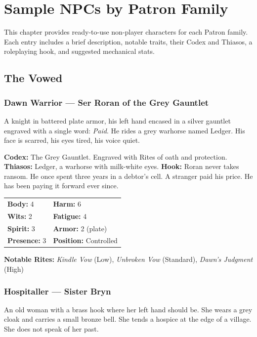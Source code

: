 \section{Sample NPCs by Patron Family}

This chapter provides ready-to-use non-player characters for each Patron family. Each entry includes a brief description, notable traits, their Codex and Thiasos, a roleplaying hook, and suggested mechanical stats.

\subsection{The Vowed}

\subsubsection{Dawn Warrior — Ser Roran of the Grey Gauntlet}

A knight in battered plate armor, his left hand encased in a silver gauntlet engraved with a single word: \textit{Paid}. He rides a grey warhorse named Ledger. His face is scarred, his eyes tired, his voice quiet.

\textbf{Codex:} The Grey Gauntlet. Engraved with Rites of oath and protection.
\textbf{Thiasos:} Ledger, a warhorse with milk-white eyes.
\textbf{Hook:} Roran never takes ransom. He once spent three years in a debtor's cell. A stranger paid his price. He has been paying it forward ever since.

\begin{tabular}{ll}
\textbf{Body:} 4 & \textbf{Harm:} 6 \\
\textbf{Wits:} 2 & \textbf{Fatigue:} 4 \\
\textbf{Spirit:} 3 & \textbf{Armor:} 2 (plate) \\
\textbf{Presence:} 3 & \textbf{Position:} Controlled \\
\end{tabular}

\textbf{Notable Rites:} \textit{Kindle Vow} (Low), \textit{Unbroken Vow} (Standard), \textit{Dawn's Judgment} (High)

\subsubsection{Hospitaller — Sister Bryn}

An old woman with a brass hook where her left hand should be. She wears a grey cloak and carries a small bronze bell. She tends a hospice at the edge of a village. She does not speak of her past.

